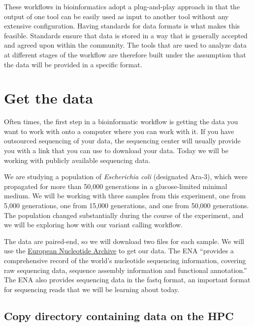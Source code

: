 \documentclass[
  letterpaper,
  DIV=11,
  numbers=noendperiod]{scrreprt}
\begin{document}
These workflows in bioinformatics adopt a plug-and-play approach in that
the output of one tool can be easily used as input to another tool
without any extensive configuration. Having standards for data formats
is what makes this feasible. Standards ensure that data is stored in a
way that is generally accepted and agreed upon within the community. The
tools that are used to analyze data at different stages of the workflow
are therefore built under the assumption that the data will be provided
in a specific format.

\hypertarget{get-the-data}{%
\section{Get the data}\label{get-the-data}}

Often times, the first step in a bioinformatic workflow is getting the
data you want to work with onto a computer where you can work with it.
If you have outsourced sequencing of your data, the sequencing center
will usually provide you with a link that you can use to download your
data. Today we will be working with publicly available sequencing data.

We are studying a population of \emph{Escherichia coli} (designated
Ara-3), which were propagated for more than 50,000 generations in a
glucose-limited minimal medium. We will be working with three samples
from this experiment, one from 5,000 generations, one from 15,000
generations, and one from 50,000 generations. The population changed
substantially during the course of the experiment, and we will be
exploring how with our variant calling workflow.

The data are paired-end, so we will download two files for each sample.
We will use the \href{https://www.ebi.ac.uk/ena}{European Nucleotide
Archive} to get our data. The ENA ``provides a comprehensive record of
the world's nucleotide sequencing information, covering raw sequencing
data, sequence assembly information and functional annotation.'' The ENA
also provides sequencing data in the fastq format, an important format
for sequencing reads that we will be learning about today.

\hypertarget{copy-directory-containing-data-on-the-hpc}{%
\subsection{Copy directory containing data on the
HPC}\label{copy-directory-containing-data-on-the-hpc}}
\end{document}
